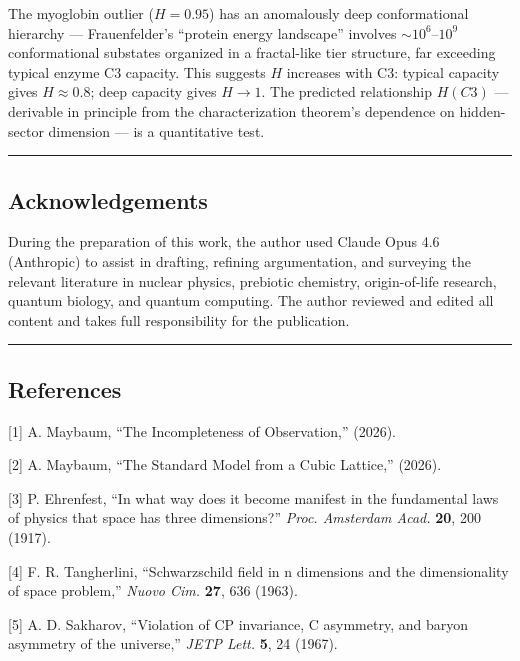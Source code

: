 \documentclass[
]{article}
\begin{document}
The myoglobin outlier (\(H = 0.95\)) has an anomalously deep
conformational hierarchy --- Frauenfelder's ``protein energy landscape''
involves \(\sim 10^6\)--\(10^9\) conformational substates organized in a
fractal-like tier structure, far exceeding typical enzyme C3 capacity.
This suggests \(H\) increases with C3: typical capacity gives
\(H \approx 0.8\); deep capacity gives \(H \to 1\). The predicted
relationship \(H(C3)\) --- derivable in principle from the
characterization theorem's dependence on hidden-sector dimension --- is
a quantitative test.

\begin{center}\rule{0.5\linewidth}{0.5pt}\end{center}

\hypertarget{acknowledgements}{%
\subsection{Acknowledgements}\label{acknowledgements}}

During the preparation of this work, the author used Claude Opus 4.6
(Anthropic) to assist in drafting, refining argumentation, and surveying
the relevant literature in nuclear physics, prebiotic chemistry,
origin-of-life research, quantum biology, and quantum computing. The
author reviewed and edited all content and takes full responsibility for
the publication.

\begin{center}\rule{0.5\linewidth}{0.5pt}\end{center}

\hypertarget{references}{%
\subsection{References}\label{references}}

{[}1{]} A. Maybaum, ``The Incompleteness of Observation,'' (2026).

{[}2{]} A. Maybaum, ``The Standard Model from a Cubic Lattice,'' (2026).

{[}3{]} P. Ehrenfest, ``In what way does it become manifest in the
fundamental laws of physics that space has three dimensions?''
\emph{Proc. Amsterdam Acad.} \textbf{20}, 200 (1917).

{[}4{]} F. R. Tangherlini, ``Schwarzschild field in n dimensions and the
dimensionality of space problem,'' \emph{Nuovo Cim.} \textbf{27}, 636
(1963).

{[}5{]} A. D. Sakharov, ``Violation of CP invariance, C asymmetry, and
baryon asymmetry of the universe,'' \emph{JETP Lett.} \textbf{5}, 24
(1967).
\end{document}
